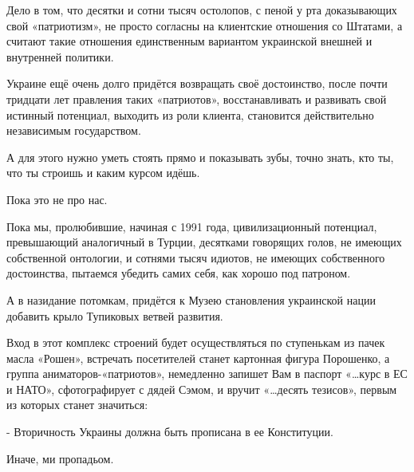 Дело в том, что десятки и сотни тысяч  остолопов, с пеной у рта доказывающих
свой «патриотизм», не просто согласны на клиентские отношения со Штатами, а
считают такие отношения единственным вариантом украинской внешней и внутренней
политики.

Украине ещё очень долго придётся возвращать своё достоинство, после почти
тридцати лет правления таких «патриотов», восстанавливать и развивать свой
истинный потенциал, выходить из роли клиента, становится действительно
независимым государством. 

А для этого нужно уметь стоять прямо и показывать зубы, точно знать, кто ты, что ты строишь и каким курсом идёшь.

Пока это не про нас.

Пока мы, пролюбившие, начиная с 1991 года, цивилизационный потенциал,
превышающий аналогичный в Турции, десятками говорящих голов, не имеющих
собственной онтологии, и сотнями тысяч идиотов, не имеющих собственного
достоинства, пытаемся убедить самих себя, как хорошо под патроном. 

А в назидание потомкам, придётся к Музею становления украинской нации добавить
крыло Тупиковых ветвей развития.

Вход в этот комплекс строений будет осуществляться по ступенькам из пачек масла
«Рошен», встречать посетителей станет   картонная фигура Порошенко, а группа
аниматоров-«патриотов», немедленно запишет Вам в паспорт «…курс в ЕС и НАТО»,
сфотографирует с дядей Сэмом, и вручит «…десять тезисов», первым из которых
станет значиться:

- Вторичность Украины должна быть прописана в ее Конституции.

Иначе, ми пропадьом.
